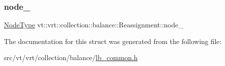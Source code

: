 \mbox{\label{structvt_1_1vrt_1_1collection_1_1balance_1_1_reassignment_ab94b05ac3a28d21a1f189f4becbe1240}} 
\subsubsection{\texorpdfstring{node\+\_\+}{node\_}}
{\footnotesize\ttfamily \hyperlink{namespacevt_a866da9d0efc19c0a1ce79e9e492f47e2}{Node\+Type} vt\+::vrt\+::collection\+::balance\+::\+Reassignment\+::node\+\_\+}



The documentation for this struct was generated from the following file\+:\begin{DoxyCompactItemize}
\item 
src/vt/vrt/collection/balance/\hyperlink{lb__common_8h}{lb\+\_\+common.\+h}\end{DoxyCompactItemize}
